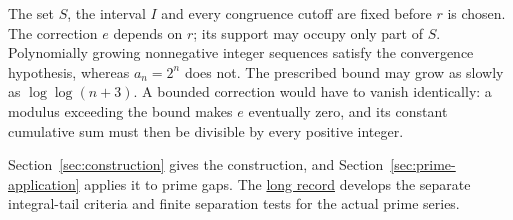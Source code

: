 \documentclass[11pt]{article}
\begin{document}
The set $S$, the interval $I$ and every congruence cutoff are fixed before
$r$ is chosen.  The correction $e$ depends on $r$; its support may occupy
only part of $S$.
Polynomially growing nonnegative integer sequences satisfy the convergence
hypothesis, whereas $a_n=2^n$ does not.  The prescribed bound may grow as slowly as
$\log\log(n+3)$.  A bounded correction would have to vanish identically:
a modulus exceeding the bound makes $e$ eventually zero, and its constant
cumulative sum must then be divisible by every positive integer.

Section~\ref{sec:construction} gives the construction, and
Section~\ref{sec:prime-application} applies it to prime gaps.  The
\href{erdos251-prime-gap-reasoning-surface.pdf\#scope-actual-tails}
{long record} develops the separate integral-tail criteria and finite
separation tests for the actual prime series.
\end{document}
